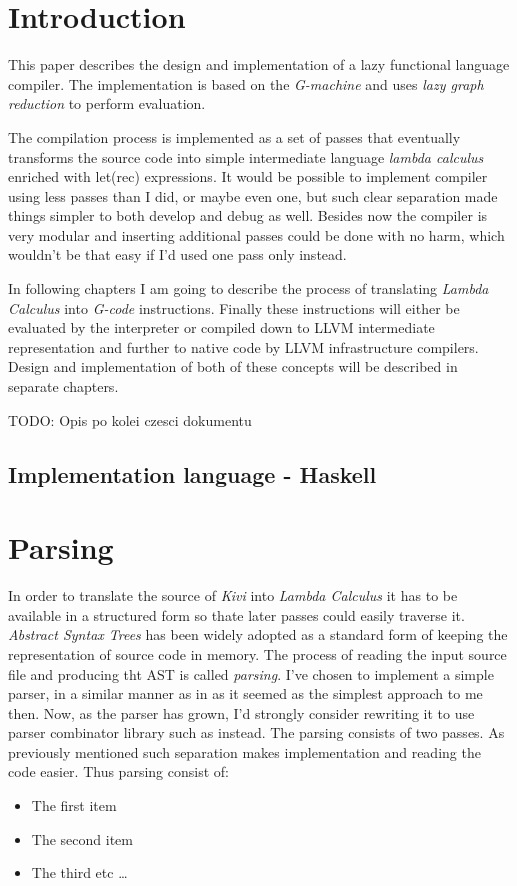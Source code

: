 \documentclass[a4paper]{report}
\begin{document}
\normalsize
{}

\tableofcontents

\chapter{Introduction}

This paper describes the design and implementation of a lazy functional
language compiler. The implementation is based on the
\textit{G-machine}\cite{jones87} and uses \textit{lazy graph reduction} to
perform evaluation.

The compilation process is implemented as a set of passes that eventually
transforms the source code into simple intermediate language \textit{lambda
calculus} enriched with let(rec) expressions. It would be possible to implement
compiler using less passes than I did, or maybe even one, but such clear
separation made things simpler to both develop and debug as well. Besides now
the compiler is very modular and inserting additional passes could be done with
no harm, which wouldn't be that easy if I'd used one pass only instead.


In following chapters I am going to describe the process of translating
\textit{Lambda Calculus} into \textit{G-code} instructions.  Finally these
instructions will either be evaluated by the interpreter or compiled down to
LLVM intermediate representation and further to native code by LLVM
infrastructure compilers. Design and implementation of both of these concepts
will be described in separate chapters.

TODO: Opis po kolei czesci dokumentu

\section{Implementation language - Haskell}

\chapter{Parsing}

In order to translate the source of \textit{Kivi} into \textit{Lambda Calculus}
it has to be available in a structured form so thate later passes could easily
traverse it. \textit{Abstract Syntax Trees}\cite{wiki:ast} has been widely adopted as a
standard form of keeping the representation of source code in memory. The
process of reading the input source file and producing tht AST is called
\textit{parsing}.
I've chosen to implement a simple parser, in a similar manner as in
\cite{joneslester00} as it seemed as the simplest approach to me then. Now, as
the parser has grown, I'd strongly consider rewriting it to use parser combinator
library such as \cite{website:parsec} instead.
The parsing consists of two passes. As previously mentioned such separation
makes implementation and reading the code easier. Thus parsing consist
of:
\begin{itemize}
  \item The first item
  \item The second item
  \item The third etc \ldots
\end{itemize}
\end{document}
